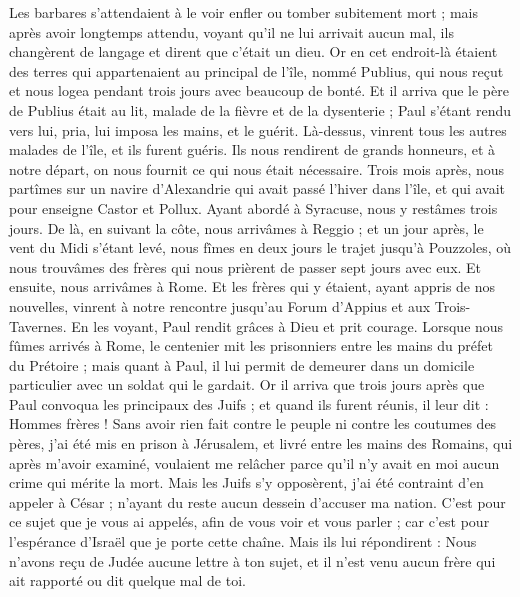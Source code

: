 \begin{multicols}{2}
Les barbares s'attendaient à le voir enfler ou tomber subitement mort ; mais après avoir longtemps attendu, voyant qu'il ne lui arrivait aucun mal, ils changèrent de langage et dirent que c'était un dieu.
Or en cet endroit-là étaient des terres qui appartenaient au principal de l'île, nommé Publius, qui nous reçut et nous logea pendant trois jours avec beaucoup de bonté.
Et il arriva que le père de Publius était au lit, malade de la fièvre et de la dysenterie ; Paul s'étant rendu vers lui, pria, lui imposa les mains, et le guérit.
Là-dessus, vinrent tous les autres malades de l'île, et ils furent guéris.
Ils nous rendirent de grands honneurs, et à notre départ, on nous fournit ce qui nous était nécessaire.
Trois mois après, nous partîmes sur un navire d'Alexandrie qui avait passé l'hiver dans l'île, et qui avait pour enseigne Castor et Pollux.
Ayant abordé à Syracuse, nous y restâmes trois jours.
De là, en suivant la côte, nous arrivâmes à Reggio ; et un jour après, le vent du Midi s'étant levé, nous fîmes en deux jours le trajet jusqu'à Pouzzoles,
où nous trouvâmes des frères qui nous prièrent de passer sept jours avec eux. Et ensuite, nous arrivâmes à Rome.
Et les frères qui y étaient, ayant appris de nos nouvelles, vinrent à notre rencontre jusqu'au Forum d'Appius et aux Trois-Tavernes. En les voyant, Paul rendit grâces à Dieu et prit courage.
Lorsque nous fûmes arrivés à Rome, le centenier mit les prisonniers entre les mains du préfet du Prétoire ; mais quant à Paul, il lui permit de demeurer dans un domicile particulier avec un soldat qui le gardait.
Or il arriva que trois jours après que Paul convoqua les principaux des Juifs ; et quand ils furent réunis, il leur dit : Hommes frères ! Sans avoir rien fait contre le peuple ni contre les coutumes des pères, j'ai été mis en prison à Jérusalem, et livré entre les mains des Romains,
qui après m'avoir examiné, voulaient me relâcher parce qu'il n'y avait en moi aucun crime qui mérite la mort.
Mais les Juifs s'y opposèrent, j'ai été contraint d'en appeler à César ; n'ayant du reste aucun dessein d'accuser ma nation.
C'est pour ce sujet que je vous ai appelés, afin de vous voir et vous parler ; car c'est pour l'espérance d'Israël que je porte cette chaîne.
Mais ils lui répondirent : Nous n'avons reçu de Judée aucune lettre à ton sujet, et il n'est venu aucun frère qui ait rapporté ou dit quelque mal de toi.

\end{multicols}
